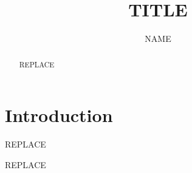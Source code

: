 \documentclass{mathprint} %
\title[SHORT]{TITLE}
\author
  {NAME}
  {ADDRESS}
  {EMAIL}
\begin{document}
\begin{abstract}
    REPLACE
\end{abstract}

\section{Introduction}
REPLACE

\begin{acknowledgements}
    REPLACE
\end{acknowledgements}
\end{document}
